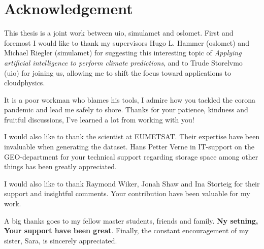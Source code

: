 \chapter*{Acknowledgement}
This thesis is a joint work between \acrfull{uio}, \acrfull{simulamet} and \acrfull{oslomet}. First and foremost I would like to thank my supervisors Hugo L. Hammer (\acrshort{oslomet}) and Michael Riegler (\acrshort{simulamet}) for suggesting this interesting topic of \textit{Applying artificial intelligence to perform climate predictions}, and to Trude Storelvmo (\acrshort{uio}) for joining us, allowing me to shift the focus toward applications to cloudphysics.

It is a poor workman who blames his tools, I admire how you tackled the corona pandemic and lead me safely to shore. Thanks for your patience, kindness and fruitful discussions, I've learned a lot from working with you!

I would also like to thank the scientist at EUMETSAT. 
Their expertise have been invaluable when generating the dataset. 
Hans Petter Verne in IT-support on the GEO-department for your technical support regarding storage space among other things has been greatly appreciated.

I would also like to thank Raymond Wiker, Jonah Shaw and Ina Storteig for their support and insightful comments. Your contribution have been valuable for my work.

A big thanks goes to my fellow master students, friends and family. \textbf{Ny setning, Your support have been great}. Finally, the constant encouragement of my sister, Sara, is sincerely appreciated.
\cleardoublepage
